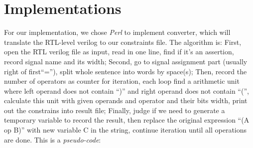 \documentclass[conference,11pt]{IEEEtran}
\begin{document}
\section{Implementations}
For our implementation, we chose \emph{Perl} to implement converter, which will translate the RTL-level verilog to our constraints file.
The algorithm is: First, open the RTL verilog file as input, read in one line, find if it's an assertion, record signal name and its width;
Second, go to signal assignment part (usually right of first``=''), split whole sentence into words by space(s);
Then, record the number of operators as counter for iteration, each loop find a arithmetic unit where left operand does not contain ``)'' and right operand does not contain ``('',
calculate this unit with given operands and operator and their bits width, print out the constrains into result file;
Finally, judge if we need to generate a temporary variable to record the result, then replace the original expression ``(A op B)'' with new variable C in the string, continue iteration until all operations are done.
This is a \emph {pseudo-code}:
\end{document}
